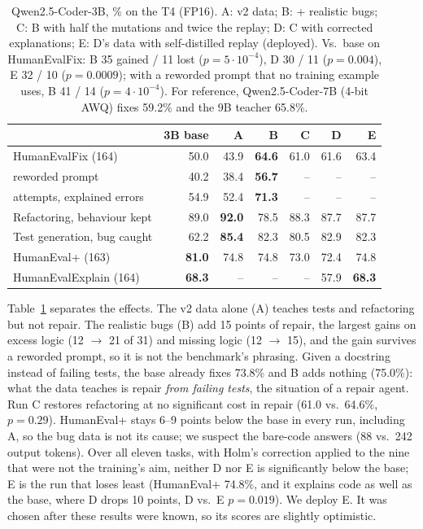 \documentclass[11pt]{article}
\begin{document}
\begin{table}[t]
\centering
\small
\begin{tabular}{lrrrrrr}
\toprule
 & 3B base & A & B & C & D & E \\
\midrule
HumanEvalFix (164) & 50.0 & 43.9 & \textbf{64.6} & 61.0 & 61.6 & 63.4 \\
\quad reworded prompt & 40.2 & 38.4 & \textbf{56.7} & -- & -- & -- \\
\quad 3 attempts, explained errors & 54.9 & 52.4 & \textbf{71.3} & -- & -- & -- \\
Refactoring, behaviour kept & 89.0 & \textbf{92.0} & 78.5 & 88.3 & 87.7 & 87.7 \\
Test generation, bug caught & 62.2 & \textbf{85.4} & 82.3 & 80.5 & 82.9 & 82.3 \\
HumanEval+ (163) & \textbf{81.0} & 74.8 & 74.8 & 73.0 & 72.4 & 74.8 \\
HumanEvalExplain (164) & \textbf{68.3} & -- & -- & -- & 57.9 & \textbf{68.3} \\
\bottomrule
\end{tabular}
\caption{Qwen2.5-Coder-3B, \% on the T4 (FP16). A: v2 data; B: + realistic bugs; C: B with half
the mutations and twice the replay; D: C with corrected explanations; E: D's data with
self-distilled replay (deployed). Vs.\ base on HumanEvalFix: B 35 gained / 11 lost
($p=5\cdot10^{-4}$), D 30 / 11 ($p=0.004$), E 32 / 10 ($p=0.0009$); with a reworded prompt that no
training example uses, B 41 / 14 ($p=4\cdot10^{-4}$). For reference, Qwen2.5-Coder-7B (4-bit AWQ)
fixes 59.2\% and the 9B teacher 65.8\%.}
\label{tab:v3}
\end{table}

Table~\ref{tab:v3} separates the effects. The v2 data alone (A) teaches tests and refactoring but
not repair. The realistic bugs (B) add 15 points of repair, the largest gains on excess logic
(12 $\rightarrow$ 21 of 31) and missing logic (12 $\rightarrow$ 15), and the gain survives a reworded prompt, so
it is not the benchmark's phrasing. Given a docstring instead of failing tests, the base already
fixes 73.8\% and B adds nothing (75.0\%): what the data teaches is repair \emph{from failing tests},
the situation of a repair agent. Run C restores refactoring at no significant cost in repair
(61.0 vs.\ 64.6\%, $p=0.29$). HumanEval+ stays 6--9 points below the base in every run, including A, so
the bug data is not its cause; we suspect the bare-code answers (88 vs.\ 242 output tokens). Over
all eleven tasks, with Holm's correction applied to the nine that were not the training's aim,
neither D nor E is significantly below the base; E is the run that loses least (HumanEval+ 74.8\%, and it
explains code as well as the base, where D drops 10 points, D vs.\ E $p=0.019$). We deploy E. It
was chosen after these results were known, so its scores are slightly optimistic.
\end{document}
